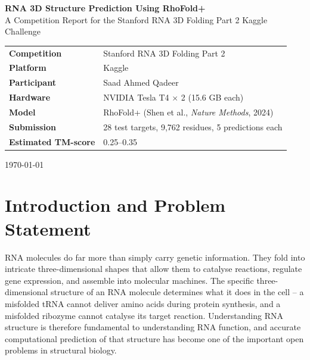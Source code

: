 \documentclass[11pt,a4paper]{article}
\begin{document}
\begin{titlepage}
    \centering
    \vspace*{2cm}
    {\LARGE \textbf{RNA 3D Structure Prediction Using RhoFold+}}\\[0.5cm]
    {\large A Competition Report for the Stanford RNA 3D Folding Part 2 Kaggle Challenge}\\[2cm]

    \begin{tabular}{ll}
        \textbf{Competition} & Stanford RNA 3D Folding Part 2 \\[4pt]
        \textbf{Platform}    & Kaggle \\[4pt]
        \textbf{Participant}        & Saad Ahmed Qadeer \\[4pt]
        \textbf{Hardware}    & NVIDIA Tesla T4 $\times$ 2 (15.6 GB each) \\[4pt]
        \textbf{Model}       & RhoFold+ (Shen et al., \textit{Nature Methods}, 2024) \\[4pt]
        \textbf{Submission}  & 28 test targets, 9,762 residues, 5 predictions each \\[4pt]
        \textbf{Estimated TM-score} & 0.25--0.35 \\
    \end{tabular}

    \vfill
    \today
\end{titlepage}

\tableofcontents
\newpage

\section{Introduction and Problem Statement}

RNA molecules do far more than simply carry genetic information. They fold into intricate three-dimensional shapes that allow them to catalyse reactions, regulate gene expression, and assemble into molecular machines. The specific three-dimensional structure of an RNA molecule determines what it does in the cell -- a misfolded tRNA cannot deliver amino acids during protein synthesis, and a misfolded ribozyme cannot catalyse its target reaction. Understanding RNA structure is therefore fundamental to understanding RNA function, and accurate computational prediction of that structure has become one of the important open problems in structural biology.
\end{document}
